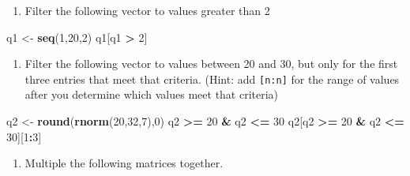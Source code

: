\documentclass[
]{book}
\newenvironment{Shaded}{\begin{snugshade}}{\end{snugshade}}
\newcommand{\DecValTok}[1]{\textcolor[rgb]{0.00,0.00,0.81}{#1}}
\newcommand{\FloatTok}[1]{\textcolor[rgb]{0.00,0.00,0.81}{#1}}
\newcommand{\KeywordTok}[1]{\textcolor[rgb]{0.13,0.29,0.53}{\textbf{#1}}}
\newcommand{\NormalTok}[1]{#1}
\newcommand{\OperatorTok}[1]{\textcolor[rgb]{0.81,0.36,0.00}{\textbf{#1}}}
\newcommand{\StringTok}[1]{\textcolor[rgb]{0.31,0.60,0.02}{#1}}
\providecommand{\tightlist}{%
  \setlength{\itemsep}{0pt}\setlength{\parskip}{0pt}}
\begin{document}
\begin{center}
\begin{enumerate}
\def\labelenumi{\arabic{enumi}.}
\tightlist
\item
  Filter the following vector to values greater than 2
\end{enumerate}

\begin{Shaded}
\begin{Highlighting}[]
\NormalTok{  q1 <-}\StringTok{ }\KeywordTok{seq}\NormalTok{(}\DecValTok{1}\NormalTok{,}\DecValTok{20}\NormalTok{,}\DecValTok{2}\NormalTok{)}
\NormalTok{  q1[q1 }\OperatorTok{>}\StringTok{ }\DecValTok{2}\NormalTok{]}
\end{Highlighting}
\end{Shaded}

\begin{enumerate}
\def\labelenumi{\arabic{enumi}.}
\setcounter{enumi}{1}
\tightlist
\item
  Filter the following vector to values between 20 and 30, but only for the first three entries that meet that criteria. (Hint: add \texttt{{[}n:n{]}} for the range of values after you determine which values meet that criteria)
\end{enumerate}

\begin{Shaded}
\begin{Highlighting}[]
\NormalTok{  q2 <-}\StringTok{ }\KeywordTok{round}\NormalTok{(}\KeywordTok{rnorm}\NormalTok{(}\DecValTok{20}\NormalTok{,}\DecValTok{32}\NormalTok{,}\DecValTok{7}\NormalTok{),}\DecValTok{0}\NormalTok{)}
\NormalTok{  q2 }\OperatorTok{>=}\StringTok{ }\DecValTok{20} \OperatorTok{&}\StringTok{ }\NormalTok{q2 }\OperatorTok{<=}\StringTok{ }\DecValTok{30}
\NormalTok{  q2[q2 }\OperatorTok{>=}\StringTok{ }\DecValTok{20} \OperatorTok{&}\StringTok{ }\NormalTok{q2 }\OperatorTok{<=}\StringTok{ }\DecValTok{30}\NormalTok{][}\DecValTok{1}\OperatorTok{:}\DecValTok{3}\NormalTok{]}
\end{Highlighting}
\end{Shaded}

\begin{enumerate}
\def\labelenumi{\arabic{enumi}.}
\setcounter{enumi}{2}
\tightlist
\item
  Multiple the following matrices together.
\end{enumerate}

\begin{Shaded}
\end{Shaded}


\end{center}
\end{document}
